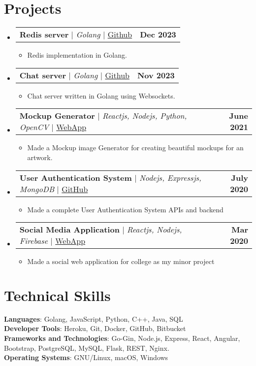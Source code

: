 \documentclass[letterpaper,11pt]{article}
\makeatletter
\newcommand{\resumeItem}[1]{
  \item\small{
    {#1 \vspace{-2pt}}
  }
}
\newcommand{\resumeProjectHeading}[2]{
    \item
    \begin{tabular*}{1.001\textwidth}{l@{\extracolsep{\fill}}r}
      \small#1 & \textbf{\small #2} \\
    \end{tabular*}\vspace{-7pt}
}
\newcommand{\resumeSubHeadingListStart}{\begin{itemize}[leftmargin=0.0in, label={}]}
\newcommand{\resumeSubHeadingListEnd}{\end{itemize}}
\newcommand{\resumeItemListStart}{\justify \begin{itemize}}
\newcommand{\resumeItemListEnd}{\end{itemize}\vspace{-5pt}}
\makeatother
\begin{document}
\section{Projects}
    \vspace{-5pt}
    \resumeSubHeadingListStart
    \resumeProjectHeading
            {\textbf{Redis server} $|$ \emph{Golang}  $|$ \href{https://github.com/owais1412/redis-in-go}{Github}}{Dec 2023}
            \resumeItemListStart
                \resumeItem{Redis implementation in Golang.}
            \resumeItemListEnd
    \resumeProjectHeading
            {\textbf{Chat server} $|$ \emph{Golang}  $|$ \href{https://github.com/owais1412/go-chat-app}{Github}}{Nov 2023}
            \resumeItemListStart
                \resumeItem{Chat server written in Golang using Websockets.}
            \resumeItemListEnd
        \resumeProjectHeading
            {\textbf{Mockup Generator} $|$ \emph{Reactjs, Nodejs, Python, OpenCV}  $|$ \href{http://mockupgenerator-12159.web.app}{WebApp}}{June 2021}
            \resumeItemListStart
                \resumeItem{Made a Mockup image Generator for creating beautiful mockups for an artwork.}
            \resumeItemListEnd
        \resumeProjectHeading
            {\textbf{User Authentication System} $|$ \emph{Nodejs, Expressjs, MongoDB} $|$ \href{https://github.com/owais1412/Node-User-Auth}{GitHub}}{July 2020}
            \resumeItemListStart
                \resumeItem{Made a complete User Authentication System APIs and backend}
            \resumeItemListEnd
        \resumeProjectHeading
            {\textbf{Social Media Application} $|$ \emph{Reactjs, Nodejs, Firebase} $|$ \href{https://svcesocialspace.web.app/login}{WebApp}}{Mar 2020}
            \resumeItemListStart
                \resumeItem{Made a social web application for college as my minor project}
            \resumeItemListEnd
    \resumeSubHeadingListEnd


%
\section{Technical Skills}
 \begin{itemize}[leftmargin=0.15in, label={}]
    {\item{
     \textbf{Languages}{: Golang, JavaScript, Python, C++, Java, SQL} \\
     \vspace{1pt}
     \textbf{Developer Tools}{: Heroku, Git, Docker, GitHub, Bitbucket} \\
     \vspace{1pt}
     \textbf{Frameworks and Technologies}{: Go-Gin, Node.js, Express, React, Angular, Bootstrap, PostgreSQL, MySQL, Flask, REST, Nginx.} \\
     \vspace{1pt}
     \textbf{Operating Systems}{: GNU/Linux, macOS, Windows} \\
    }}
 \end{itemize}
 \vspace{-16pt}
\end{document}
